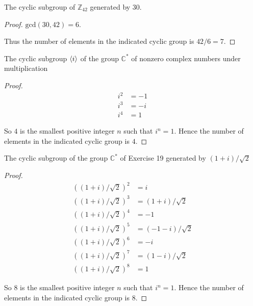 \begin{exercise}
    The cyclic subgroup of $\mathbb{Z}_{42}$ generated by $30$.
\end{exercise}

\begin{proof}
    $\text{gcd}(30, 42) = 6$.

    Thus the number of elements in the indicated cyclic group is $42/6 = 7$.
\end{proof}

\begin{exercise}
    The cyclic subgroup $\left\langle{i}\right\rangle$ of the group $\mathbb{C}^{*}$ of nonzero complex numbers under multiplication
\end{exercise}

\begin{proof}
    \begin{align*}
        i^{2} & = -1 \\
        i^{3} & = -i \\
        i^{4} & = 1
    \end{align*}

    So $4$ is the smallest positive integer $n$ such that $i^{n} = 1$. Hence the number of elements in the indicated cyclic group is $4$.
\end{proof}

\begin{exercise}
    The cyclic subgroup of the group $\mathbb{C}^{*}$ of Exercise 19 generated by $(1 + i)/\sqrt{2}$
\end{exercise}

\begin{proof}
    \begin{align*}
        {((1 + i)/\sqrt{2})}^{2} & = i                   \\
        {((1 + i)/\sqrt{2})}^{3} & = {(1 + i)/\sqrt{2}}  \\
        {((1 + i)/\sqrt{2})}^{4} & = -1                  \\
        {((1 + i)/\sqrt{2})}^{5} & = {(-1 - i)/\sqrt{2}} \\
        {((1 + i)/\sqrt{2})}^{6} & = -i                  \\
        {((1 + i)/\sqrt{2})}^{7} & = {(1 - i)/\sqrt{2}}  \\
        {((1 + i)/\sqrt{2})}^{8} & = 1
    \end{align*}

    So $8$ is the smallest positive integer $n$ such that $i^{n} = 1$. Hence the number of elements in the indicated cyclic group is $8$.
\end{proof}

